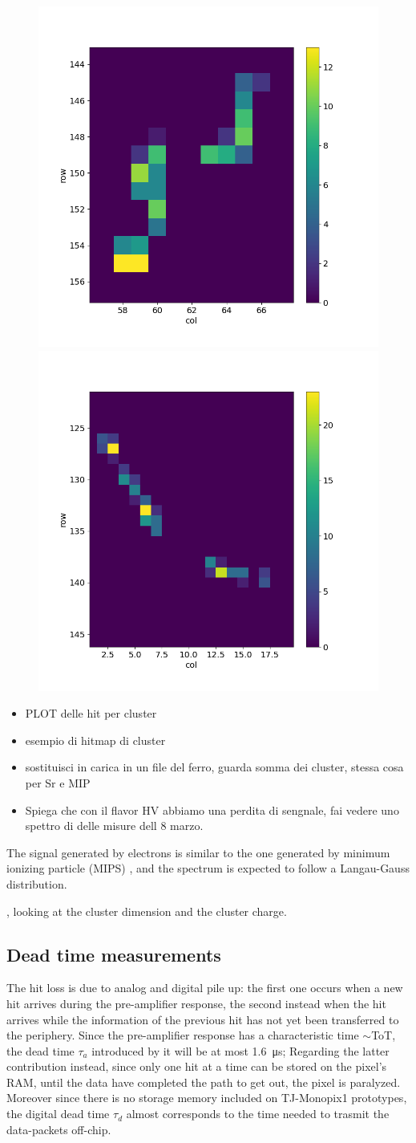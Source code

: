 \begin{figure}[h!]
            \includegraphics[width=.24\linewidth]{figures/charaterization/evts/Sr90/22a.png}
            \includegraphics[width=.24\linewidth]{figures/charaterization/evts/Sr90/25a.png}               
            \caption{ }
            \label{fig:hit_map_Sr90}
        \end{figure}         

        \begin{itemize}
            \item PLOT delle hit per cluster
            \item  esempio di hitmap di cluster
            \item sostituisci in carica in un file del ferro, guarda somma dei cluster, stessa cosa per Sr e MIP
            \item  Spiega che con il flavor HV abbiamo una perdita di sengnale, fai vedere uno spettro di delle misure dell 8 marzo. 
        \end{itemize}
        The signal generated by electrons is similar to the one generated by minimum ionizing particle (MIPS) , and the spectrum is expected to follow a Langau-Gauss distribution.
        
        , looking at the cluster dimension and the cluster charge.  


    \subsection{Dead time measurements}
        The hit loss is due to analog and digital pile up: the first one occurs when a new hit arrives during the pre-amplifier response, the second instead when the hit arrives while the information of the previous hit has not yet been transferred to the periphery.  
        Since the pre-amplifier response has a characteristic time $\sim$ToT, the dead time $\tau_{a}$ introduced by it will be at most \SI{1.6}{\us};    
        Regarding the latter contribution instead, since only one hit at a time can be stored on the pixel's RAM, until the data have completed the path to get out, the pixel is paralyzed. Moreover since there is no storage memory included on TJ-Monopix1 prototypes, the digital dead time $\tau_{d}$ almost corresponds to the time needed to trasmit the data-packets off-chip. 

